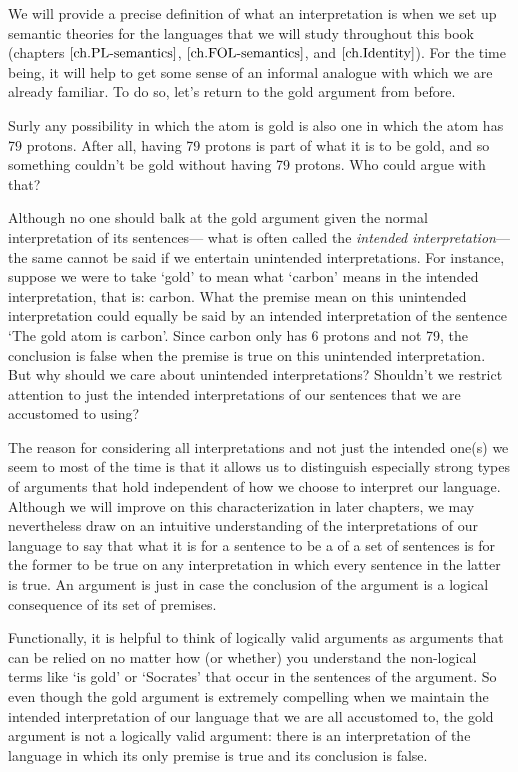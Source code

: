 We will provide a precise definition of what an interpretation is when we set up semantic theories for the languages that we will study throughout this book (chapters $\ref{ch.PL-semantics}$, $\ref{ch.FOL-semantics}$, and $\ref{ch.Identity}$).
For the time being, it will help to get some sense of an informal analogue with which we are already familiar.
To do so, let's return to the gold argument from before.

Surly any possibility in which the atom is gold is also one in which the atom has 79 protons.
After all, having 79 protons is part of what it is to be gold, and so something couldn't be gold without having 79 protons.
Who could argue with that?

Although no one should balk at the gold argument given the normal interpretation of its sentences--- what is often called the \textit{intended interpretation}--- the same cannot be said if we entertain unintended interpretations.
For instance, suppose we were to take `gold' to mean what `carbon' means in the intended interpretation, that is: carbon.
What the premise mean on this unintended interpretation could equally be said by an intended interpretation of the sentence `The gold atom is carbon'.
Since carbon only has 6 protons and not 79, the conclusion is false when the premise is true on this unintended interpretation.
But why should we care about unintended interpretations?
Shouldn't we restrict attention to just the intended interpretations of our sentences that we are accustomed to using?

The reason for considering all interpretations and not just the intended one(s) we seem to most of the time is that it allows us to distinguish especially strong types of arguments that hold independent of how we choose to interpret our language.
Although we will improve on this characterization in later chapters, we may nevertheless draw on an intuitive understanding of the interpretations of our language to say that what it is for a sentence to be a  of a set of sentences is for the former to be true on any interpretation in which every sentence in the latter is true. 
An argument is  just in case the conclusion of the argument is a logical consequence of its set of premises.

Functionally, it is helpful to think of logically valid arguments as arguments that can be relied on no matter how (or whether) you understand the non-logical terms like `is gold' or `Socrates' that occur in the sentences of the argument.
So even though the gold argument is extremely compelling when we maintain the intended interpretation of our language that we are all accustomed to, the gold argument is not a logically valid argument: there is an interpretation of the language in which its only premise is true and its conclusion is false.

